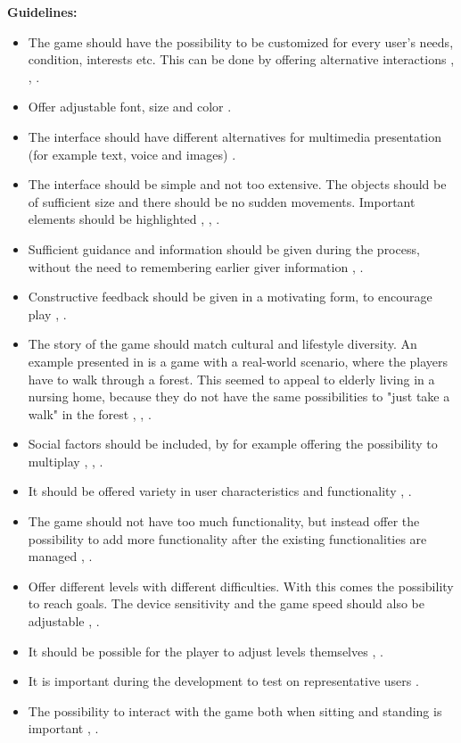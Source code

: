 \textbf{Guidelines:}

\begin{itemize}
\renewcommand{\labelitemi}{$\bullet$}
\item The game should have the possibility to be customized for every user's needs, condition, interests etc. This can be done by offering alternative interactions \cite{Billis}, \cite{gregor}, \cite{gerling1}.
\item Offer adjustable font, size and color \cite{Billis}.
\item The interface should have different alternatives for multimedia presentation (for example text, voice and images) \cite{Billis}.
\item The interface should be simple and not too extensive. The objects should be of sufficient size and there should be no sudden movements. Important elements should be highlighted \cite{Billis}, \cite{gerling1}, \cite{gerling2}.
\item Sufficient guidance and information should be given during the process, without the need to remembering earlier giver information \cite{Billis}, \cite{gregor}.
\item Constructive feedback should be given in a motivating form, to encourage play \cite{Billis}, \cite{gerling1}.
\item The story of the game should match cultural and lifestyle diversity. An example presented in \cite{gerling2} is a game with a real-world scenario, where the players have to walk through a forest. This seemed to appeal to elderly living in a nursing home, because they do not have the same possibilities to "just take a walk" in the forest \cite{Billis}, \cite{gregor}, \cite{gerling2}. 
\item Social factors should be included, by for example offering the possibility to multiplay \cite{Billis}, \cite{gerling2}, \cite{gerling1}.
\item It should be offered variety in user characteristics and functionality \cite{gregor}, \cite{gerling1}.
\item The game should not have too much functionality, but instead offer the possibility to add more functionality after the existing functionalities are managed \cite{gregor}, \cite{gerling2}.
\item Offer different levels with different difficulties. With this comes the possibility to reach goals. The device sensitivity and the game speed should also be adjustable \cite{gregor}, \cite{gerling1}.
\item It should be possible for the player to adjust levels themselves \cite{gregor}, \cite{gerling1}. 
\item It is important during the development to test on representative users \cite{gregor}.
\item The possibility to interact with the game both when sitting and standing is important \cite{gerling1}, \cite{gerling2}.
\end{itemize}






